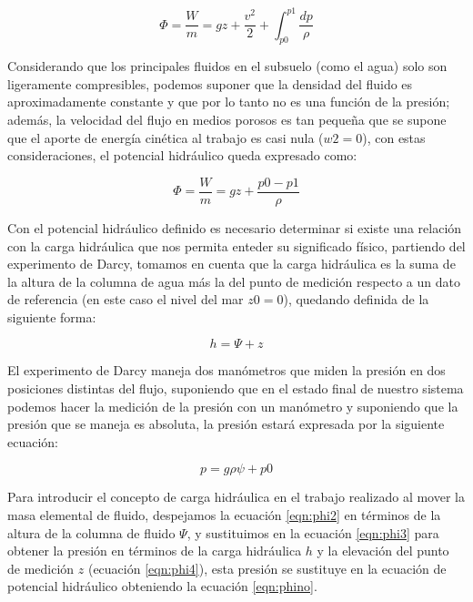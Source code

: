 \begin{equation}
\label{eqn:phi1}
\Phi=\dfrac{W}{m}= gz + \dfrac{v^{2}}{2} + \int_{p0}^{p1}  \! \dfrac{dp}{\rho} 
\end{equation}

Considerando que los principales fluidos en el subsuelo (como el agua) solo son ligeramente compresibles, podemos suponer que la densidad del fluido es aproximadamente constante y que por lo tanto no es una función de la presión; además, la velocidad del flujo en medios porosos es tan pequeña que se supone que el aporte de energía cinética al trabajo es casi nula ($w2=0$), con estas consideraciones, el potencial hidráulico queda expresado como:

\begin{equation}
\label{eqn:phi1}
\Phi=\dfrac{W}{m}= gz + \dfrac{p0-p1}{\rho} 
\end{equation}

Con el potencial hidráulico definido es necesario determinar si existe una relación con la carga hidráulica que nos permita enteder su significado físico, partiendo del experimento de Darcy, tomamos en cuenta que la carga hidráulica es la suma de la altura de la columna de agua más la del punto de medición respecto a un dato de referencia (en este caso el nivel del mar $z0=0$), quedando definida de la siguiente forma:

\begin{equation}
\label{eqn:phi2}
h=\Psi+z
\end{equation}

El experimento de Darcy maneja dos manómetros que miden la presión en dos posiciones distintas del flujo, suponiendo que en el estado final de nuestro sistema podemos hacer la medición de la presión con un manómetro y suponiendo que la presión que se maneja es absoluta, la presión estará expresada por la siguiente ecuación:

\begin{equation}
\label{eqn:phi3}
p=g\rho\psi+p0
\end{equation}  

Para introducir el concepto de carga hidráulica en el trabajo realizado al mover la masa elemental de fluido, despejamos la ecuación \ref{eqn:phi2} en términos de la altura de la columna de fluido $\Psi$, y sustituimos en la ecuación \ref{eqn:phi3} para obtener la presión en términos de la carga hidráulica $h$ y la elevación del punto de medición $z$ (ecuación \ref{eqn:phi4}), esta presión se sustituye en la ecuación de potencial hidráulico obteniendo la ecuación \ref{eqn:phino}.

